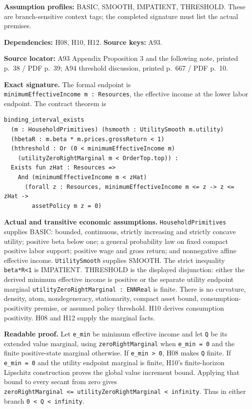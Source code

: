 \documentclass[
  11pt,
]{article}
\let\LedgerOriginalTexttt\texttt
\renewcommand{\texttt}[1]{{\small\LedgerOriginalTexttt{#1}}}
\begin{document}
\textbf{Assumption profiles:} BASIC, SMOOTH, IMPATIENT, THRESHOLD. These
are branch-sensitive context tags; the completed signature must list the
actual premises.

\textbf{Dependencies:} H08, H10, H12. \textbf{Source keys:} A93.

\textbf{Source locator:} A93 Appendix Proposition 3 and the following
note, printed p.~38 / PDF p.~39; A94 threshold discussion, printed
p.~667 / PDF p.~10.

\textbf{Exact signature.} The formal endpoint is
\texttt{minimumEffectiveIncome\ m\ :\ Resources}, the effective income
at the lower labor endpoint. The contract theorem is

\begin{verbatim}
binding_interval_exists
  (m : HouseholdPrimitives) (hsmooth : UtilitySmooth m.utility)
  (hbetaR : m.beta * m.prices.grossReturn < 1)
  (hthreshold : Or (0 < minimumEffectiveIncome m)
    (utilityZeroRightMarginal m < OrderTop.top)) :
  Exists fun zHat : Resources =>
    And (minimumEffectiveIncome m < zHat)
      (forall z : Resources, minimumEffectiveIncome m <= z -> z <= zHat ->
        assetPolicy m z = 0)
\end{verbatim}

\textbf{Actual and transitive economic assumptions.}
\texttt{HouseholdPrimitives} supplies BASIC: bounded, continuous,
strictly increasing and strictly concave utility; positive beta below
one; a general probability law on fixed compact positive labor support;
positive wage and gross return; and nonnegative affine effective income.
\texttt{UtilitySmooth} supplies SMOOTH. The strict inequality
\texttt{beta*R\textless{}1} is IMPATIENT. THRESHOLD is the displayed
disjunction: either the derived minimum effective income is positive or
the separate utility endpoint marginal
\texttt{utilityZeroRightMarginal\ :\ ENNReal} is finite. There is no
curvature, density, atom, nondegeneracy, stationarity, compact asset
bound, consumption-positivity premise, or assumed policy threshold. H10
derives consumption positivity. H08 and H12 supply the marginal facts.

\textbf{Readable proof.} Let \texttt{e\_min} be minimum effective income
and let \texttt{Q} be its extended value marginal, using
\texttt{zeroRightMarginal} when \texttt{e\_min\ =\ 0} and the finite
positive-state marginal otherwise. If
\texttt{e\_min\ \textgreater{}\ 0}, H08 makes \texttt{Q} finite. If
\texttt{e\_min\ =\ 0} and the utility endpoint marginal is finite, H10's
finite-horizon Lipschitz construction proves the global value increment
bound. Applying that bound to every secant from zero gives
\texttt{zeroRightMarginal\ \textless{}=\ utilityZeroRightMarginal\ \textless{}\ infinity}.
Thus in either branch \texttt{0\ \textless{}\ Q\ \textless{}\ infinity}.
\end{document}

